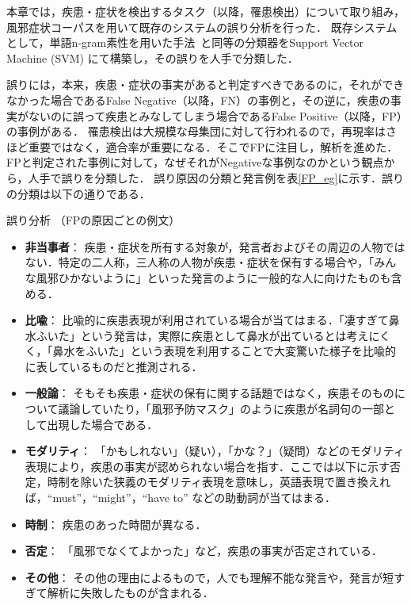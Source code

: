 \documentclass[japanese]{jnlp_1.4}
\begin{document}
本章では，疾患・症状を検出するタスク（以降，罹患検出）について取り組み，風邪症状コーパスを用いて既存のシステムの誤り分析を行った．
既存システムとして，単語n-gram素性を用いた手法~\cite{aramaki-maskawa-morita:2011:EMNLP}と同等の分類器をSupport Vector Machine (SVM) にて構築し，その誤りを人手で分類した．

  誤りには，本来，疾患・症状の事実があると判定すべきであるのに，それができなかった場合であるFalse Negative（以降，FN）の事例と，その逆に，疾患の事実がないのに誤って疾患とみなしてしまう場合であるFalse Positive（以降，FP）の事例がある．
 罹患検出は大規模な母集団に対して行われるので，再現率はさほど重要ではなく，適合率が重要になる．そこでFPに注目し，解析を進めた．
 FPと判定された事例に対して，なぜそれがNegativeな事例なのかという観点から，人手で誤りを分類した．
 誤り原因の分類と発言例を表\ref{FP_eg}に示す．誤りの分類は以下の通りである．

\begin{table}[t]
\caption{誤り分析 （FPの原因ごとの例文）}
\label{FP_eg}

\end{table}

\begin{itemize}
\item \textbf{非当事者}： 疾患・症状を所有する対象が，発言者およびその周辺の人物ではない．特定の二人称，三人称の人物が疾患・症状を保有する場合や，「みんな風邪ひかないように」といった発言のように一般的な人に向けたものも含める．
\item \textbf{比喩}： 比喩的に疾患表現が利用されている場合が当てはまる．「凄すぎて鼻水ふいた」という発言は，実際に疾患として鼻水が出ているとは考えにくく，「鼻水をふいた」という表現を利用することで大変驚いた様子を比喩的に表しているものだと推測される．
\item \textbf{一般論}： そもそも疾患・症状の保有に関する話題ではなく，疾患そのものについて議論していたり，「風邪予防マスク」のように疾患が名詞句の一部として出現した場合である．
\item \textbf{モダリティ}： 「かもしれない」（疑い），「かな？」（疑問）などのモダリティ表現により，疾患の事実が認められない場合を指す．ここでは以下に示す否定，時制を除いた狭義のモダリティ表現を意味し，英語表現で置き換えれば，``must''，``might''，``have to'' などの助動詞が当てはまる．
\item \textbf{時制}： 疾患のあった時間が異なる．
\item \textbf{否定}： 「風邪でなくてよかった」など，疾患の事実が否定されている．
\item \textbf{その他}： その他の理由によるもので，人でも理解不能な発言や，発言が短すぎて解析に失敗したものが含まれる．
\end{itemize}
\end{document}
